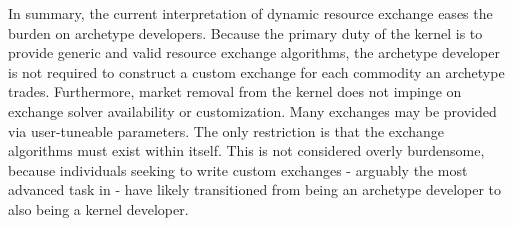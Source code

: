 In summary, the current interpretation of dynamic resource exchange 
eases the burden on archetype developers. Because the primary duty of the 
kernel is to provide generic and valid resource exchange algorithms,
the archetype developer is not required to construct a custom exchange for 
each commodity an archetype trades. Furthermore, market removal from the
kernel does not 
impinge on exchange solver availability or customization.  Many exchanges may 
be provided via user-tuneable parameters.  The only restriction 
is that the exchange algorithms must exist within \cyclus itself.  This is not 
considered overly burdensome, because individuals seeking to write custom 
exchanges - arguably the most advanced task in \cyclus - have likely 
transitioned from being an archetype developer to also being a kernel developer.
